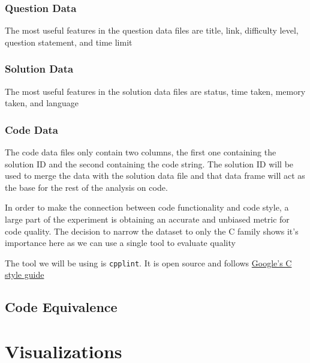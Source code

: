 \documentclass{article}
\begin{document}
\subsubsection{Question Data}\label{question-data}

The most useful features in the question data files are title, link,
difficulty level, question statement, and time limit

\subsubsection{Solution Data}\label{solution-data}

The most useful features in the solution data files are status, time
taken, memory taken, and language

\subsubsection{Code Data}\label{code-data}

The code data files only contain two columns, the first one containing
the solution ID and the second containing the code string. The solution
ID will be used to merge the data with the solution data file and that
data frame will act as the base for the rest of the analysis on code.

In order to make the connection between code functionality and code
style, a large part of the experiment is obtaining an accurate and
unbiased metric for code quality. The decision to narrow the dataset to
only the C family shows it's importance here as we can use a single tool
to evaluate quality

The tool we will be using is \texttt{cpplint}. It is open source and
follows
\href{https://google.github.io/styleguide/cppguide.html}{Google's C
style guide}

\subsection{Code Equivalence}\label{code-equivalence}

\section{Visualizations}\label{visualizations}



\end{document}
